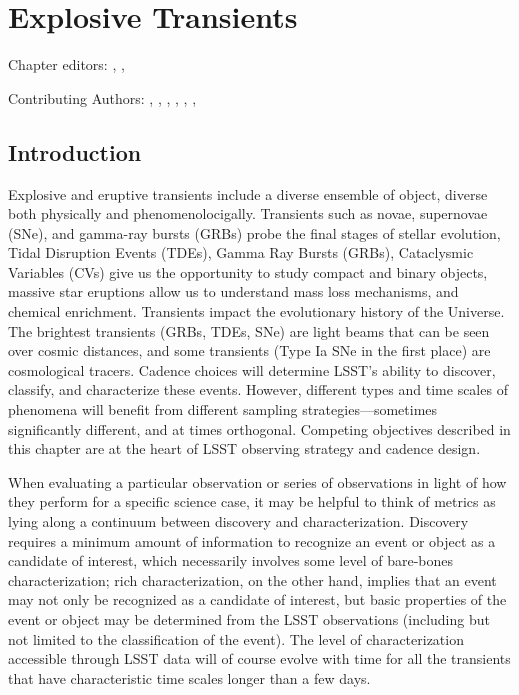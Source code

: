 
\chapter[Eruptive and Explosive Transients]{Explosive Transients}
\def\chpname{transients}\label{chp:\chpname}


Chapter editors:
,
,

Contributing Authors:
,
,
,
,
,
,


\section{Introduction}


Explosive and eruptive transients include a diverse ensemble of
object, diverse both physically and phenomenolocigally. Transients
such as novae, supernovae (SNe), and gamma-ray bursts (GRBs) probe the
final stages of stellar evolution, Tidal Disruption Events (TDEs),
Gamma Ray Bursts (GRBs), Cataclysmic Variables (CVs) give us the
opportunity to study compact and binary objects, massive star
eruptions allow us to understand mass loss mechanisms, and chemical
enrichment. Transients impact the evolutionary history of the
Universe. The brightest transients (GRBs, TDEs, SNe) are light beams
that can be seen over cosmic distances, and some transients (Type Ia
SNe in the first place) are cosmological tracers.  Cadence choices
will determine LSST's ability to discover, classify, and characterize
these events. However, different types and time scales of phenomena
will benefit from different sampling strategies---sometimes
significantly different, and at times orthogonal.  Competing
objectives described in this chapter are at the heart of LSST
observing strategy and cadence design.

When evaluating a particular observation or series of observations in
light of how they perform for a specific science case, it may be
helpful to think of metrics as lying along a continuum between
discovery and characterization. Discovery requires a minimum amount of
information to recognize an event or object as a candidate of
interest, which necessarily involves some level of bare-bones
characterization; rich characterization, on the other hand, implies
that an event may not only be recognized as a candidate of interest,
but basic properties of the event or object may be determined from the
LSST observations (including but not limited to the classification of
the event). The level of characterization accessible through LSST data
will of course evolve with time for all the transients that have
characteristic time scales longer than a few days.

